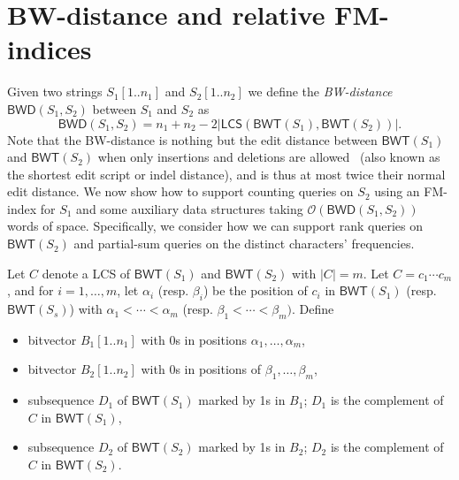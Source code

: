 \documentclass{llncs}
\newcommand{\Oh}[1]
  {\ensuremath{\mathcal{O}\!\left( {#1} \right)}}
\newcommand{\LCS}
  {\ensuremath{\mathsf{LCS}}}
\newcommand{\BWD}
  {\ensuremath{\mathsf{BWD}}}
\newcommand{\BWT}
  {\ensuremath{\mathsf{BWT}}}
\begin{document}
\section{BW-distance and relative FM-indices} \label{sec:BWdiv}

Given two strings \(S_1 [1..n_1]\) and \(S_2 [1..n_2]\) we define the {\em
BW-distance\/} \(\BWD (S_1, S_2)\) between $S_1$ and $S_2$ as
\begin{equation}\label{eq:BWDdef}
\BWD(S_1, S_2) = n_1 + n_2 - 2 |\LCS(\BWT (S_1),\BWT (S_2))|.
\end{equation}
Note that the BW-distance is nothing but the edit distance between
$\BWT(S_1)$ and $\BWT(S_2)$ when only insertions and deletions are
allowed~\cite{Myers86} (also known as the shortest edit script or indel distance),
and is thus at most twice their normal edit distance. We now show
how to support counting queries on $S_2$ using an FM-index for $S_1$ and some
auxiliary data structures taking $\Oh{\BWD (S_1, S_2)}$ words of space.
Specifically, we consider how we can support rank queries on \(\BWT (S_2)\)
and partial-sum queries on the distinct characters' frequencies.

Let $C$ denote a LCS of $\BWT (S_1)$ and $\BWT(S_2)$ with $|C|=m$. Let $C=c_1
\cdots c_m$, and for $i=1,\ldots,m$, let $\alpha_i$ (resp. $\beta_i$) be the
position of $c_i$ in $\BWT(S_1)$ (resp. $\BWT(S_s)$) with $\alpha_1 < \cdots
< \alpha_{m}$ (resp. $\beta_1 < \cdots < \beta_{m})$. Define
\begin{itemize}
\item bitvector \(B_1 [1..n_1]\) with 0s in positions  $\alpha_1, \ldots,
    \alpha_m$,
\item bitvector \(B_2 [1..n_2]\) with 0s in positions of $\beta_1,
    \ldots, \beta_m$,
\item subsequence $D_1$ of \(\BWT (S_1)\) marked by 1s in $B_1$; $D_1$ is
    the complement of $C$ in $\BWT (S_1)$,
\item subsequence $D_2$ of \(\BWT (S_2)\) marked by 1s in $B_2$; $D_2$ is
    the complement of $C$ in $\BWT (S_2)$.
\end{itemize}
\end{document}
